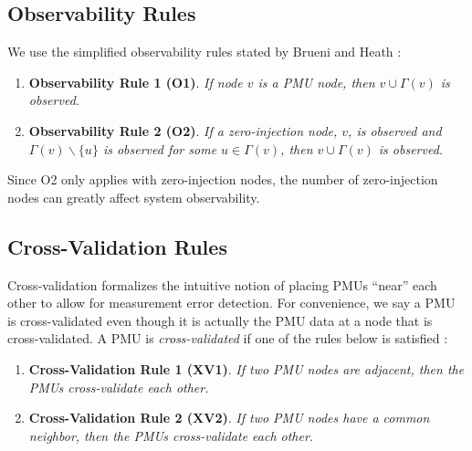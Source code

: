 \subsection{Observability Rules}
\label{subsec:observe}

We use the simplified observability rules stated by Brueni and Heath \cite{Brueni05}:
\begin{enumerate}
	
	\item {\bf Observability Rule 1 (O1)}.  {\it If node $v$ is a PMU node, then $v \cup \Gamma(v)$ is observed. } %

	\item {\bf Observability Rule 2 (O2)}. {\it If a zero-injection node, $v$, is observed and  $\Gamma(v)\backslash\{u\}$ is observed for some $u\in\Gamma(v)$, then $v \cup \Gamma(v)$ is observed.}

\end{enumerate}
Since O2 only applies with zero-injection nodes, the number of zero-injection nodes can greatly affect system observability. 

\subsection{Cross-Validation Rules}
\label{subsec:xval-rules}

Cross-validation formalizes the intuitive notion of placing PMUs ``near'' each other to allow for measurement error detection. 
For convenience, we say a PMU is cross-validated even though it is actually the PMU data at a node that is cross-validated.
A PMU is \emph{cross-validated} if one of the rules below is satisfied \cite{Vanfretti10}: 
\begin{enumerate}
	
	\item {\bf Cross-Validation Rule 1 (XV1)}.  {\it If two PMU nodes are adjacent, then the PMUs cross-validate each other. }

	\item {\bf Cross-Validation Rule 2 (XV2)}. {\it If two PMU nodes have a common neighbor, then the PMUs cross-validate each other.}
\end{enumerate}

